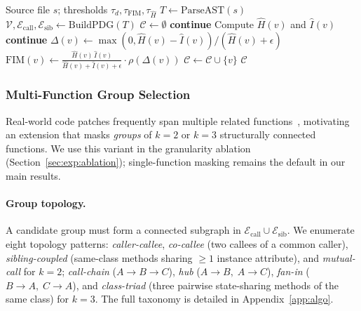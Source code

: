 \begin{algorithm}[t]
\caption{Single-function FIM target selection for one file.}
\label{alg:selection}
\begin{algorithmic}[1]
  \Require Source file $s$; thresholds $\tau_d, \tau_{\mathrm{FIM}}, \tau_{\hat H}$
  \State $T \gets \mathrm{ParseAST}(s)$
  \State $\mathcal{V}, \mathcal{E}_{\mathrm{call}}, \mathcal{E}_{\mathrm{sib}} \gets \mathrm{BuildPDG}(T)$
  \State $\mathcal{C} \gets \emptyset$
      \State \textbf{continue}
    \EndIf
    \State Compute $\hat{H}(v)$ and $\hat{I}(v)$
     \textbf{continue} \EndIf
    \State $\Delta(v) \gets \max(0, \hat{H}(v)-\hat{I}(v)) / (\hat{H}(v)+\epsilon)$
    \State $\mathrm{FIM}(v) \gets \frac{\hat{H}(v)\,\hat{I}(v)}{\hat{H}(v)+\hat{I}(v)+\epsilon}\cdot \rho(\Delta(v))$
      \State $\mathcal{C} \gets \mathcal{C} \cup \{v\}$
    \EndIf
  \EndFor
  \State \Return $\mathcal{C}$ 
\end{algorithmic}
\end{algorithm}

\subsubsection{Multi-Function Group Selection}
\label{sec:method:groups}

Real-world code patches frequently span multiple related
functions~\citep{swebench}, motivating an extension that masks
\emph{groups} of $k = 2$ or $k = 3$ structurally connected functions.
We use this variant in the granularity ablation
(Section~\ref{sec:exp:ablation}); single-function masking remains the
default in our main results.

\paragraph{Group topology.}
A candidate group must form a connected subgraph in
$\mathcal{E}_{\mathrm{call}} \cup \mathcal{E}_{\mathrm{sib}}$. We enumerate
eight topology patterns:
\textit{caller-callee}, \textit{co-callee} (two callees of a common caller),
\textit{sibling-coupled} (same-class methods sharing $\geq 1$ instance
attribute), and \textit{mutual-call} for $k=2$;
\textit{call-chain} ($A \!\to\! B \!\to\! C$),
\textit{hub} ($A \!\to\! B,\; A \!\to\! C$),
\textit{fan-in} ($B \!\to\! A,\; C \!\to\! A$),
and \textit{class-triad} (three pairwise state-sharing methods of the same
class) for $k=3$. The full taxonomy is detailed in Appendix~\ref{app:algo}.

